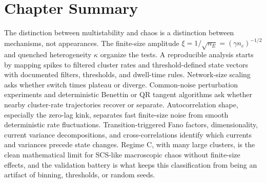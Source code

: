 \section{Chapter Summary}
\label{sec:ch09-summary}

The distinction between multistability and chaos is a distinction between
mechanisms, not appearances. The finite-size amplitude
\(\xi=1/\sqrt{n_E}=(\gamma n_c)^{-1/2}\) and quenched heterogeneity \(\kappa\)
organize the tests. A reproducible analysis starts by mapping spikes to
filtered cluster rates and threshold-defined state vectors with documented
filters, thresholds, and dwell-time rules. Network-size scaling asks whether
switch times plateau or diverge. Common-noise perturbation experiments and
deterministic Benettin or QR tangent algorithms ask whether nearby cluster-rate
trajectories recover or separate. Autocorrelation shape, especially the
zero-lag kink, separates fast finite-size noise from smooth deterministic rate
fluctuations. Transition-triggered Fano factors, dimensionality, current
variance decompositions, and cross-correlations identify which currents and
variances precede state changes. Regime C, with many large clusters, is the
clean mathematical limit for SCS-like macroscopic chaos without finite-size
effects, and the validation battery is what keeps this classification from
being an artifact of binning, thresholds, or random seeds.
